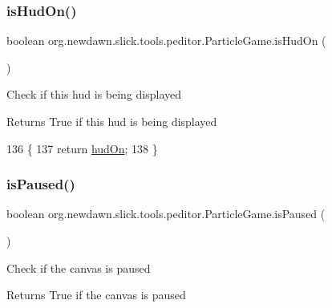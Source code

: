 \subsubsection{\texorpdfstring{is\+Hud\+On()}{isHudOn()}}
{\footnotesize\ttfamily boolean org.\+newdawn.\+slick.\+tools.\+peditor.\+Particle\+Game.\+is\+Hud\+On (\begin{DoxyParamCaption}{ }\end{DoxyParamCaption})\hspace{0.3cm}{\ttfamily [inline]}}

Check if this hud is being displayed

\begin{DoxyReturn}{Returns}
True if this hud is being displayed 
\end{DoxyReturn}

\begin{DoxyCode}
136                              \{
137         \textcolor{keywordflow}{return} \mbox{\hyperlink{classorg_1_1newdawn_1_1slick_1_1tools_1_1peditor_1_1_particle_game_ad055acd32b363a046861f244260245f1}{hudOn}};
138     \}
\end{DoxyCode}
\mbox{\label{classorg_1_1newdawn_1_1slick_1_1tools_1_1peditor_1_1_particle_game_a8eb47c41d8633e1703884537ceb2a8ae}} 
\subsubsection{\texorpdfstring{is\+Paused()}{isPaused()}}
{\footnotesize\ttfamily boolean org.\+newdawn.\+slick.\+tools.\+peditor.\+Particle\+Game.\+is\+Paused (\begin{DoxyParamCaption}{ }\end{DoxyParamCaption})\hspace{0.3cm}{\ttfamily [inline]}}

Check if the canvas is paused

\begin{DoxyReturn}{Returns}
True if the canvas is paused 
\end{DoxyReturn}

